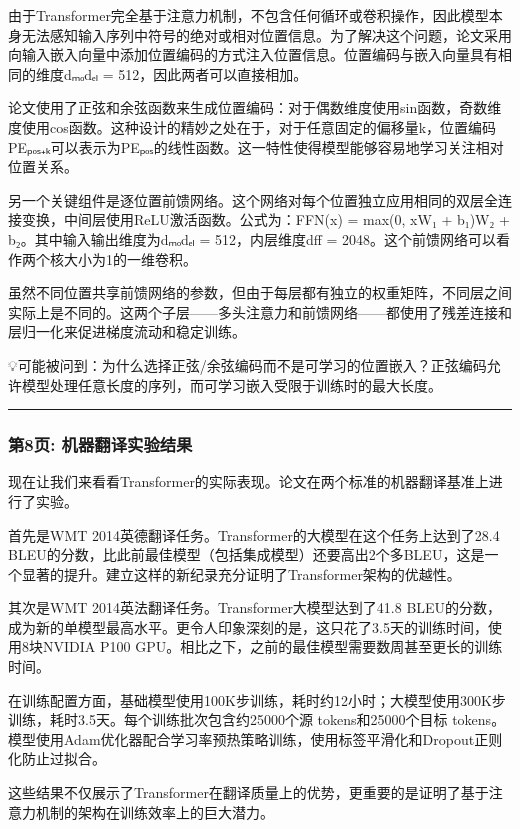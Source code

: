 \documentclass[11pt,a4paper]{article}
\begin{document}
由于Transformer完全基于注意力机制，不包含任何循环或卷积操作，因此模型本身无法感知输入序列中符号的绝对或相对位置信息。为了解决这个问题，论文采用向输入嵌入向量中添加位置编码的方式注入位置信息。位置编码与嵌入向量具有相同的维度dₘₒdₑₗ = 512，因此两者可以直接相加。

论文使用了正弦和余弦函数来生成位置编码：对于偶数维度使用sin函数，奇数维度使用cos函数。这种设计的精妙之处在于，对于任意固定的偏移量k，位置编码PEₚₒₛ₊ₖ可以表示为PEₚₒₛ的线性函数。这一特性使得模型能够容易地学习关注相对位置关系。

另一个关键组件是逐位置前馈网络。这个网络对每个位置独立应用相同的双层全连接变换，中间层使用ReLU激活函数。公式为：FFN(x) = max(0, xW₁ + b₁)W₂ + b₂。其中输入输出维度为dₘₒdₑₗ = 512，内层维度dff = 2048。这个前馈网络可以看作两个核大小为1的一维卷积。

虽然不同位置共享前馈网络的参数，但由于每层都有独立的权重矩阵，不同层之间实际上是不同的。这两个子层——多头注意力和前馈网络——都使用了残差连接和层归一化来促进梯度流动和稳定训练。

💡可能被问到：为什么选择正弦/余弦编码而不是可学习的位置嵌入？正弦编码允许模型处理任意长度的序列，而可学习嵌入受限于训练时的最大长度。

\vspace{0.5em}\noindent\rule{\textwidth}{0.4pt}\vspace{0.5em}

\subsubsection*{第8页: 机器翻译实验结果}

现在让我们来看看Transformer的实际表现。论文在两个标准的机器翻译基准上进行了实验。

首先是WMT 2014英德翻译任务。Transformer的大模型在这个任务上达到了28.4 BLEU的分数，比此前最佳模型（包括集成模型）还要高出2个多BLEU，这是一个显著的提升。建立这样的新纪录充分证明了Transformer架构的优越性。

其次是WMT 2014英法翻译任务。Transformer大模型达到了41.8 BLEU的分数，成为新的单模型最高水平。更令人印象深刻的是，这只花了3.5天的训练时间，使用8块NVIDIA P100 GPU。相比之下，之前的最佳模型需要数周甚至更长的训练时间。

在训练配置方面，基础模型使用100K步训练，耗时约12小时；大模型使用300K步训练，耗时3.5天。每个训练批次包含约25000个源 tokens和25000个目标 tokens。模型使用Adam优化器配合学习率预热策略训练，使用标签平滑化和Dropout正则化防止过拟合。

这些结果不仅展示了Transformer在翻译质量上的优势，更重要的是证明了基于注意力机制的架构在训练效率上的巨大潜力。
\end{document}
